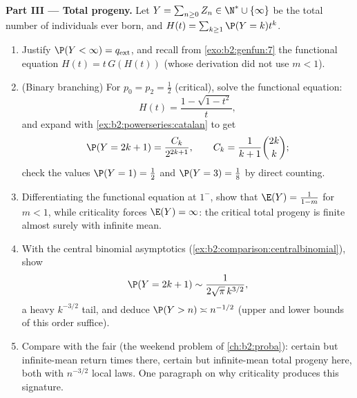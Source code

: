 \begin{problem}
\medskip
\noindent\textbf{Part III --- Total progeny.} Let $Y =
\sum_{n\geq0}Z_n \in \N^* \cup \{\infty\}$ be the total number
of individuals ever born, and $H(t) =
\sum_{k\geq1}\P(Y = k)t^k$.
\begin{enumerate}[resume]
  \item Justify $\P(Y < \infty) = q_{\mathrm{ext}}$, and
        recall from \cref{exo:b2:genfun:7} the functional
        equation $H(t) = t\,G(H(t))$ (whose derivation did
        not use $m < 1$).
  \item (Binary branching) For $p_0 = p_2 = \frac12$
        (critical), solve the functional equation:
        \[
        H(t) = \frac{1 - \sqrt{1 - t^2}}{t},
        \]
        and expand with \cref{ex:b2:powerseries:catalan} to
        get
        \[
        \P(Y = 2k + 1) = \frac{C_k}{2^{2k+1}},
        \qquad C_k = \frac1{k+1}\binom{2k}k ;
        \]
        check the values $\P(Y = 1) = \frac12$ and $\P(Y = 3)
        = \frac18$ by direct counting.
  \item Differentiating the functional equation at $1^-$,
        show that $\E(Y) = \frac{1}{1-m}$ for $m < 1$, while
        criticality forces $\E(Y) = \infty$: the critical
        total progeny is finite almost surely with infinite
        mean.
  \item With the central binomial asymptotics
        (\cref{ex:b2:comparison:centralbinomial}), show
        \[
        \P(Y = 2k+1) \sim \frac{1}{2\sqrt\pi\,k^{3/2}},
        \]
        a heavy $k^{-3/2}$ tail, and deduce $\P(Y > n)
        \asymp n^{-1/2}$ (upper and lower bounds of this
        order suffice).
  \item Compare with the fair  (the weekend
        problem of \cref{ch:b2:proba}): certain but
        infinite-mean return times there, certain but
        infinite-mean total progeny here, both with
        $n^{-3/2}$ local laws. One paragraph on why
        criticality produces this signature.
\end{enumerate}


\end{problem}
